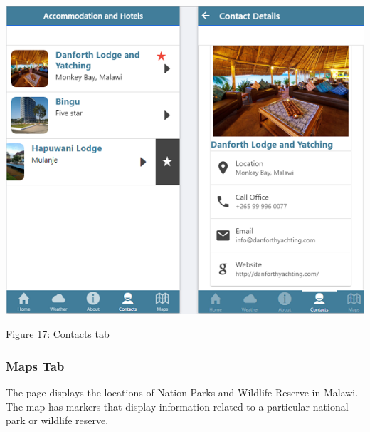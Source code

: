 \begin{center}    
	\includegraphics{img/contacts.png}
\end{center}
\begin{center}
	Figure 17: Contacts tab 
\end{center}
\paragraph{}

\subsubsection{Maps Tab}
The page displays the locations of Nation Parks and Wildlife Reserve in Malawi. The map has markers that display information related to a particular national park or wildlife reserve.

